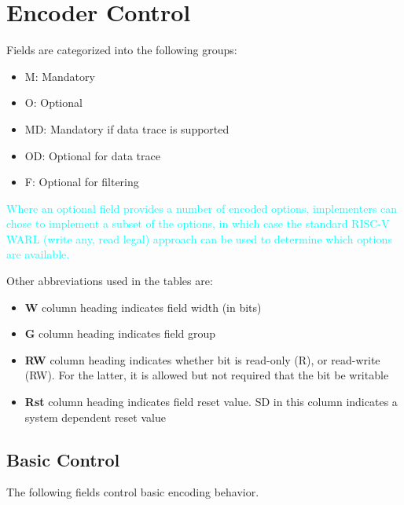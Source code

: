 \chapter{Encoder Control} \label{encoderControl}

Fields are categorized into the following groups:

\begin{itemize}
  \item M: Mandatory
  \item O: Optional
  \item MD: Mandatory if data trace is supported
  \item OD: Optional for data trace
  \item F: Optional for filtering
\end{itemize}

\textcolor{cyan}{Where an optional field provides a number of encoded options, implementers can chose to implement a subset of the options, 
in which case the standard RISC-V WARL (write any, read legal) approach can be used to determine which options are available.}

Other abbreviations used in the tables are:
\begin{itemize}
  \item \textbf{W} column heading indicates field width (in bits)
  \item \textbf{G} column heading indicates field group
  \item \textbf{RW} column heading indicates whether bit is read-only (R), or read-write (RW).  
    For the latter, it is allowed but not required that the bit be writable
  \item \textbf{Rst} column heading indicates field reset value. SD in this column indicates a system dependent reset value
\end{itemize}

\section{Basic Control} \label{sec:ctl-basic}

The following fields control basic encoding behavior.

